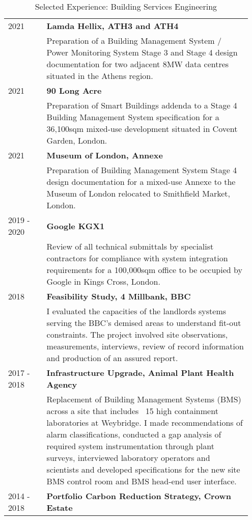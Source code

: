\documentclass[11pt, oneside]{article}   	%
\begin{document}
\begin{table}[h]
\vspace{-5mm}
\caption*{Selected Experience: Building Services Engineering}
\vspace{-5mm}
\small
\begin{center}
\begin{tabular}{p{0.15\linewidth} p{0.8\linewidth}}
\hline
2021&\textbf{Lamda Hellix, ATH3 and ATH4} \\
&Preparation of a Building Management System / Power Monitoring System Stage 3 and Stage 4 design documentation for two adjacent 8MW data centres situated in the Athens region.\\
2021 &\textbf{90 Long Acre} \\
&Preparation of Smart Buildings addenda to a Stage 4 Building Management System specification for a 36,100sqm mixed-use development situated in Covent Garden, London.\\
2021&\textbf{Museum of London, Annexe} \\
&Preparation of Building Management System Stage 4 design documentation for a mixed-use Annexe to the Museum of London relocated to Smithfield Market, London.\\
2019 - 2020&\textbf{Google KGX1} \\
&Review of all technical submittals by specialist contractors for compliance with system integration requirements for a 100,000sqm office to be occupied by Google in Kings Cross, London.\\
2018&\textbf{Feasibility Study, 4 Millbank, BBC} \\
&I evaluated the capacities of the landlords systems serving the BBC’s demised areas to understand fit-out constraints. The project involved site observations, measurements, interviews, review of record information and production of an assured report. \\
2017 - 2018&\textbf{Infrastructure Upgrade, Animal Plant Health Agency} \\
&Replacement of Building Management Systems (BMS) across a site that includes ~15 high containment laboratories at Weybridge. I made recommendations of alarm classifications, conducted a gap analysis of required system instrumentation through plant surveys, interviewed laboratory operators and scientists and developed specifications for the new site BMS control room and BMS head-end user interface. \\
2014 - 2018&\textbf{Portfolio Carbon Reduction Strategy, Crown Estate} \\

\end{tabular}
\end{center}
\end{table}
\end{document}
